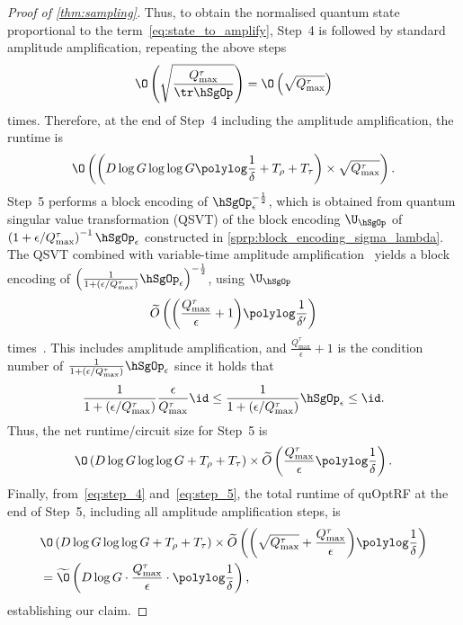 \begin{proof}[Proof of \cref{thm:sampling}]
Thus, to obtain the normalised quantum state proportional to the term~\cref{eq:state_to_amplify}, Step~4 is followed by standard amplitude amplification, repeating the above steps $$\O\left(\sqrt{\frac{Q_{\max}^{\tau}}{\tr\hSgOp}}\right)=\O\left(\sqrt{Q_{\max}^{\tau}}\right)$$ times.
Therefore, at the end of Step~4 including the amplitude amplification, the runtime is
\begin{equation}
  \label{eq:step_4}
  \O\left(\left(D\log G \log\log G \polylog\frac{1}{\delta}+T_\rho+T_\tau\right)\times\sqrt{Q_{\max}^{\tau}}\right).
\end{equation}
Step~5 performs a block encoding of $\hSgOp_\epsilon^{-\frac{1}{2}}$, which is obtained from quantum singular value transformation (QSVT) of the block encoding $\U_{\hSgOp}$ of $\left(1+\epsilon/Q_{\max}^{\tau}\right)^{-1}\hSgOp_\epsilon$ constructed in \cref{sprp:block_encoding_sigma_lambda}.
The QSVT combined with variable-time amplitude amplification~\cite{Ambainis2012VariableTimeAmpAmp,Chakraborty2018TheSimulation} yields a block encoding of ${\left(\frac{1}{1+(\epsilon/Q_{\max}^{\tau})}\hSgOp_\epsilon\right)}^{-\frac{1}{2}}$, using $\U_{\hSgOp}$ 
 $$\widetilde{O}\left({\left(\frac{Q_{\max}^{\tau}}{\epsilon}+1\right)}\polylog\frac{1}{\delta'}\right)$$ 
 times~\cite{Gilyen2018QuantumArithmetics}. This includes amplitude amplification,
and $\frac{Q_{\max}^{\tau}}{\epsilon}+1$ is the condition number of $\frac{1}{1+(\epsilon/Q_{\max}^{\tau})}\hSgOp_\epsilon$ since it holds that
\begin{equation}
  \frac{1}{1+(\epsilon/Q_{\max}^{\tau})}\frac{\epsilon}{Q_{\max}^{\tau}}\id\leq\frac{1}{1+(\epsilon/Q_{\max}^{\tau})}\hSgOp_\epsilon\leq\id.
\end{equation}
Thus, the net runtime/circuit size for Step~5  is
\begin{align}
  \label{eq:step_5}
  \O\left(D\log G \log\log G +T_\rho+T_\tau\right)\times\widetilde{O}\left(\frac{Q_{\max}^{\tau}}{\epsilon}\polylog\frac{1}{\delta}\right).
\end{align}
Finally, from~\cref{eq:step_4} and~\cref{eq:step_5}, the total runtime of quOptRF at the end of Step~5, including all amplitude amplification steps, is 
\begin{align}
  &\O\left(D\log G \log\log G +T_\rho+T_\tau\right)\times\widetilde{O}\left({\left(\sqrt{Q_{\max}^{\tau}}+\frac{Q_{\max}^{\tau}}{\epsilon}\right)}\polylog\frac{1}{\delta}\right)\nonumber\\
  &=\widetilde{\O}\left(D\log G\cdot\frac{Q_{\max}^{\tau}}{\epsilon}\cdot\polylog\frac{1}{\delta}\right),
\end{align}
establishing our claim.
\end{proof}

